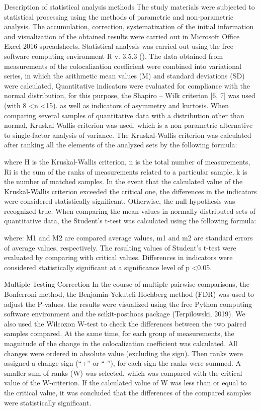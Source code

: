 \documentclass[a4paper,12pt]{article}
\begin{document}
Description of statistical analysis methods
The study materials were subjected to statistical processing using the methods of parametric and non-parametric analysis. The accumulation, correction, systematization of the initial information and visualization of the obtained results were carried out in Microsoft Office Excel 2016 spreadsheets.
Statistical analysis was carried out using the free software computing environment R v. 3.5.3 (\cite{team2014r}).
The data obtained from measurements of the colocalization coefficient were combined into variational series, in which the arithmetic mean values (M) and standard deviations (SD) were calculated,
Quantitative indicators were evaluated for compliance with the normal distribution, for this purpose, the Shapiro – Wilk criterion [6, 7] was used (with 8 <n <15).
as well as indicators of asymmetry and kurtosis.
When comparing several samples of quantitative data with a distribution other than normal, Kruskal-Wallis criterion was used, which is a non-parametric alternative to single-factor analysis of variance. The Kruskal-Wallis criterion was calculated after ranking all the elements of the analyzed sets by the following formula:



where H is the Kruskal-Wallis criterion, n is the total number of measurements, Ri is the sum of the ranks of measurements related to a particular sample, k is the number of matched samples.
In the event that the calculated value of the Kruskal-Wallis criterion exceeded the critical one, the differences in the indicators were considered statistically significant. Otherwise, the null hypothesis was recognized true.
When comparing the mean values in normally distributed sets of quantitative data, the Student’s t-test was calculated using the following formula:

where: M1 and M2 are compared average values, m1 and m2 are standard errors of average values, respectively. The resulting values of Student's t-test were evaluated by comparing with critical values. Differences in indicators were considered statistically significant at a significance level of p <0.05.

Multiple Testing Correction
In the course of multiple pairwise comparisons, the Bonferroni method, the Benjamin-Yekuteli-Hochberg method (FDR) was used to adjust the P-values.
the results were visualized using the free Python computing software environment and the scikit-posthocs package (Terpilowski, 2019).
We also used the Wilcoxon W-test to check the differences between the two paired samples compared. At the same time, for each group of measurements, the magnitude of the change in the colocalization coefficient was calculated. All changes were ordered in absolute value (excluding the sign). Then ranks were assigned a change sign (“+” or “-”), for each sign the ranks were summed. A smaller sum of ranks (W) was selected, which was compared with the critical value of the W-criterion. If the calculated value of W was less than or equal to the critical value, it was concluded that the differences of the compared samples were statistically significant.
\end{document}
